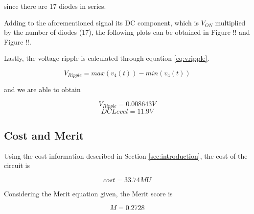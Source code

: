 since there are 17 diodes in series.

Adding to the aforementioned signal its DC component, which is $V_{ON}$ multiplied by the number of diodes (17), the following plots can be obtained in Figure !! and Figure !!.

Lastly, the voltage ripple is calculated through equation \ref{eq:vripple}.

\begin{equation}
    V_{Ripple} = max(v_4(t)) - min(v_4(t))
    \label{eq:vripple}
\end{equation}

and we are able to obtain 

\begin{equation}
    V_{Ripple} = 0.008643 V
\end{equation}
\begin{equation}
    DC Level = 11.9 V
\end{equation}

\subsection{Cost and Merit}
\label{subsec:theo_merit}

Using the cost information described in Section \ref{sec:introduction}, the cost of the circuit is

\begin{equation}
    cost = 33.74 MU
\end{equation}

Considering the Merit equation given, the Merit score is

\begin{equation}
    M = 0.2728
\end{equation}
